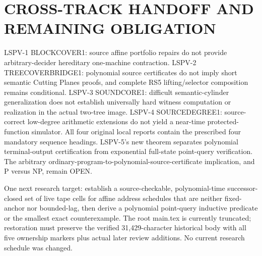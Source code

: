 \documentclass[11pt]{article}
\begin{document}
\section{CROSS-TRACK HANDOFF AND REMAINING OBLIGATION}
LSPV-1 BLOCKCOVER1: source affine portfolio repairs do not provide arbitrary-decider hereditary one-machine contraction. LSPV-2 TREECOVERBRIDGE1: polynomial source certificates do not imply short semantic Cutting Planes proofs, and complete RS5 lifting/selector composition remains conditional. LSPV-3 SOUNDCORE1: difficult semantic-cylinder generalization does not establish universally hard witness computation or realization in the actual two-tree image. LSPV-4 SOURCEDEGREE1: source-correct low-degree arithmetic extensions do not yield a near-time protected-function simulator. All four original local reports contain the prescribed four mandatory sequence headings. LSPV-5's new theorem separates polynomial terminal-output certification from exponential full-state point-query verification. The arbitrary ordinary-program-to-polynomial-source-certificate implication, and P versus NP, remain OPEN.

One next research target: establish a source-checkable, polynomial-time successor-closed set of live tape cells for affine address schedules that are neither fixed-anchor nor bounded-lag, then derive a polynomial point-query inductive predicate or the smallest exact counterexample. The root main.tex is currently truncated; restoration must preserve the verified 31,429-character historical body with all five ownership markers plus actual later review additions. No current research schedule was changed.
\end{document}

